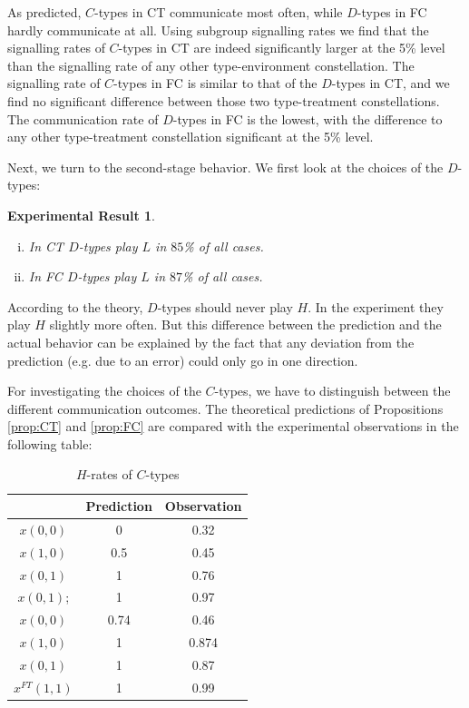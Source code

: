\documentclass[12pt]{article}
\theoremstyle{break}
\newtheorem{result}{Experimental Result}\theoremstyle{break}
\begin{document}
As predicted, $C$-types in CT communicate most often, while $D$-types in FC hardly communicate at all. Using subgroup signalling rates we find that the signalling rates of $C$-types in CT are indeed significantly larger at the 5\% level than the signalling rate of any other type-environment constellation. The signalling rate of $C$-types in FC is similar to that of the $D$-types in CT, and we find no significant difference between those two type-treatment constellations. The communication rate of $D$-types in FC is the lowest, with the difference to any other type-treatment constellation significant at the 5\% level.

Next, we turn to the second-stage behavior. We first look at the choices of the $D$-types:

\begin{result}
	\begin{enumerate}[i)]\setlength\itemsep{0em}
		\item In CT $D$-types play $L$ in $85$\% of all cases.
		\item In FC $D$-types play $L$ in $87$\% of all cases.
	\end{enumerate}
\end{result}

According to the theory, $D$-types should never play $H$. In the experiment they play $H$ slightly more often. But this difference between the prediction and the actual behavior can be explained by the fact that any deviation from the prediction (e.g. due to an error) could only go in one direction.

For investigating the choices of the $C$-types, we have to distinguish between the different communication outcomes. The theoretical predictions of Propositions \ref{prop:CT} and \ref{prop:FC} are compared with the experimental observations in the following table:

\begin{table}[h!]
\begin{center}
	\begin{tabular}{c c c}
			& Prediction & Observation \\
			\hline
			 $x(0,0)$ 	& 0	& 0.32\\
			$x(1,0)$	& 0.5 & 0.45\\ 
            $x(0,1)$  	& 1	& 0.76\\
			$x(0,1)$; 	& 1 & 0.97\\ 
			\hline
			 $x(0,0)$ 	& 0.74	& 0.46\\ 
			 $x(1,0)$ & 1 & 0.874\\ 
			 $x(0,1)$ & 1 & 0.87\\
			 $x^{FT}(1,1)$ & 1 &  0.99\\ 
			\hline
	\end{tabular}
	\end{center}
	\label{H-rates of $C$-types}
	\caption{$H$-rates of $C$-types}	
\end{table}
\end{document}
